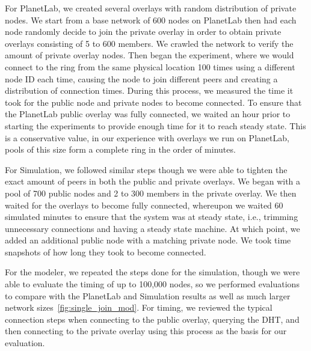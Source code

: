 \documentclass[conference]{IEEEtran}
\begin{document}
For PlanetLab, we created several overlays with random distribution of private
nodes.  We start from a base network of
600 nodes on PlanetLab then had each node randomly decide to join the private
overlay in order to obtain private overlays consisting of 5 to 600 members.  We
crawled the network to verify the amount of private overlay nodes.  Then began the
experiment, where we would connect to the ring from the same physical location 100 times
using a different node ID each time, causing the node to join different peers and
creating a distribution of connection times. During this process, we measured the time it
took for the public node and private nodes to become connected.  To ensure that
the PlanetLab public overlay was fully connected, we waited an hour prior to starting the
experiments to provide enough time for it to reach steady state. This is a conservative
value, in our experience with overlays we run on PlanetLab, pools of this size form a complete
ring in the order of minutes.

For Simulation, we followed similar steps though we were able to tighten the
exact amount of peers in both the public and private overlays.  We began with
a pool of 700 public nodes and 2 to 300 members in the private overlay.  We
then waited for the overlays to become fully connected, whereupon we waited
60 simulated minutes to ensure that the system was at steady state, i.e.,
trimming unnecessary connections and having a steady state machine.  At which
point, we added an additional public node with a matching private node.  We
took time snapshots of how long they took to become connected.

For the modeler, we repeated the steps done for the simulation, though
we were able to evaluate the timing of up to 100,000 nodes, so we performed
evaluations to compare with the PlanetLab and Simulation results as well as
much larger network sizes~\ref{fig:single_join_mod}.  For timing, we reviewed
the typical connection steps when connecting to the public overlay, querying
the DHT, and then connecting to the private overlay using this process as the
basis for our evaluation.
\end{document}
